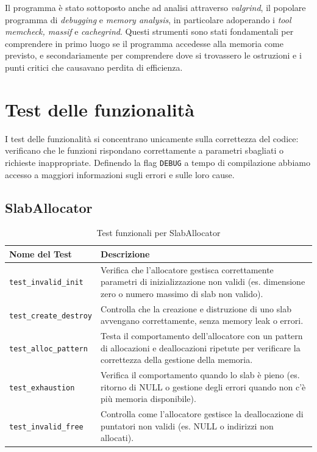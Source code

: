 Il programma è stato sottoposto anche ad analisi attraverso \textit{valgrind}, il popolare programma di \textit{debugging} e \textit{memory analysis}, in particolare adoperando i \textit{tool} \textit{memcheck, massif} e \textit{cachegrind}. Questi strumenti sono stati fondamentali per comprendere in primo luogo se il programma accedesse alla memoria come previsto, e secondariamente per comprendere dove si trovassero le ostruzioni e i punti critici che causavano perdita di efficienza.

\section{Test delle funzionalità}

I test delle funzionalità si concentrano unicamente sulla correttezza del codice: verificano che le funzioni rispondano correttamente a parametri sbagliati o richieste inappropriate. Definendo la flag \lstinline|DEBUG| a tempo di compilazione abbiamo accesso a maggiori informazioni sugli errori e sulle loro cause. 

\subsection{SlabAllocator}
\begin{table}[H]
\centering
\begin{tabularx}{\textwidth}{|l|X|}
\hline
\textbf{Nome del Test} & \textbf{Descrizione} \\
\hline
\texttt{test\_invalid\_init} & Verifica che l'allocatore gestisca correttamente parametri di inizializzazione non validi (es. dimensione zero o numero massimo di slab non valido). \\
\hline
\texttt{test\_create\_destroy} & Controlla che la creazione e distruzione di uno slab avvengano correttamente, senza memory leak o errori. \\
\hline
\texttt{test\_alloc\_pattern} & Testa il comportamento dell'allocatore con un pattern di allocazioni e deallocazioni ripetute per verificare la correttezza della gestione della memoria. \\
\hline
\texttt{test\_exhaustion} & Verifica il comportamento quando lo slab è pieno (es. ritorno di NULL o gestione degli errori quando non c'è più memoria disponibile). \\
\hline
\texttt{test\_invalid\_free} & Controlla come l'allocatore gestisce la deallocazione di puntatori non validi (es. NULL o indirizzi non allocati). \\
\hline
\end{tabularx}
\caption{Test funzionali per SlabAllocator}
\end{table}

